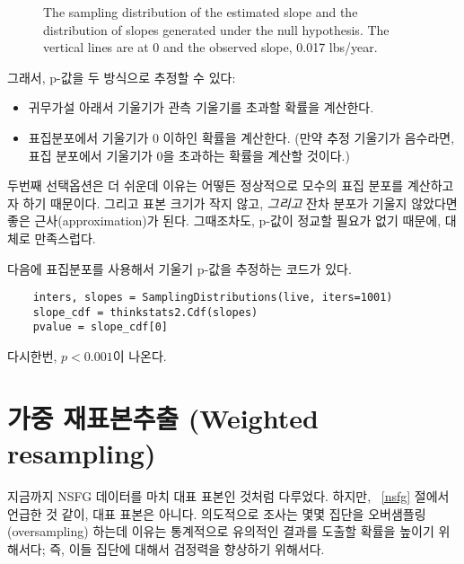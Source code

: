 
\begin{figure}
\caption{The sampling distribution of the estimated
slope and the distribution of slopes
generated under the null hypothesis.  The vertical lines are at 0
and the observed slope, 0.017 lbs/year.}
\label{linear4}
\end{figure}

그래서, p-값을 두 방식으로 추정할 수 있다:

\begin{itemize}

\item 귀무가설 아래서 기울기가 관측 기울기를 초과할 확률을 계산한다.

\item 표집분포에서 기울기가 0 이하인 확률을 계산한다. (만약 추정 기울기가 음수라면, 표집 분포에서 기울기가 0을 초과하는 확률을 계산할 것이다.)

\end{itemize}

두번째 선택옵션은 더 쉬운데 이유는 어떻든 정상적으로 모수의 표집 분포를 계산하고자 하기 때문이다. 그리고 표본 크기가 작지 않고, {\em 그리고} 잔차 분포가 기울지 않았다면 좋은 근사(approximation)가 된다. 그때조차도, p-값이 정교할 필요가 없기 때문에, 대체로 만족스럽다.


다음에 표집분포를 사용해서 기울기 p-값을 추정하는 코드가 있다.

\begin{verbatim}
    inters, slopes = SamplingDistributions(live, iters=1001)
    slope_cdf = thinkstats2.Cdf(slopes)
    pvalue = slope_cdf[0]
\end{verbatim}

다시한번, $p < 0.001$이 나온다.  


\section{가중 재표본추출 (Weighted resampling)}
\label{weighted}

지금까지 NSFG 데이터를 마치 대표 표본인 것처럼 다루었다. 하지만, ~\ref{nsfg} 절에서 언급한 것 같이, 대표 표본은 아니다. 의도적으로 조사는 몇몇 집단을 오버샘플링(oversampling) 하는데 이유는 통계적으로 유의적인 결과를 도출할 확률을 높이기 위해서다; 즉, 이들 집단에 대해서 검정력을 향상하기 위해서다.

